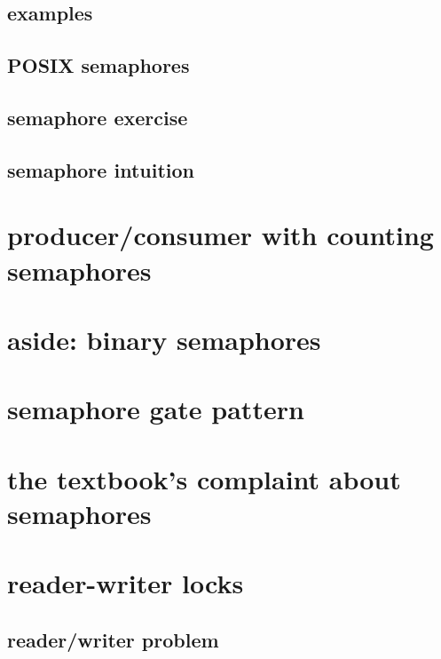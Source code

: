 

\subsection{examples}



\subsection{POSIX semaphores}



\subsection{semaphore exercise}


\subsection{semaphore intuition}


\section{producer/consumer with counting semaphores}


\section{aside: binary semaphores}


\section{semaphore gate pattern}


\section{the textbook's complaint about semaphores}


\section{reader-writer locks}

\subsection{reader/writer problem}

